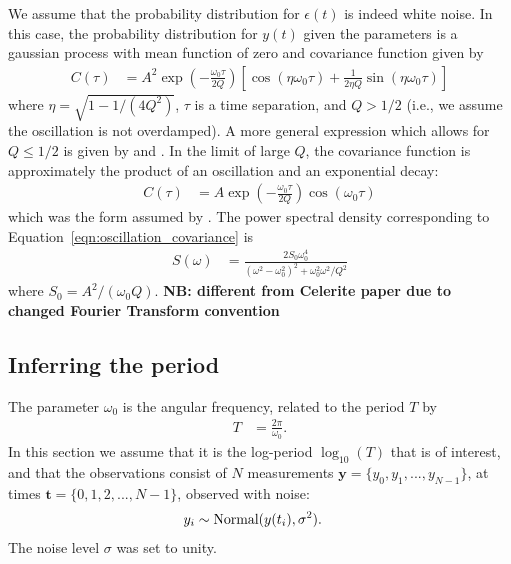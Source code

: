 \documentclass[a4paper, 12pt]{article}
\begin{document}
We assume that the probability distribution for $\epsilon(t)$ is indeed white
noise. In this case, the probability distribution for $y(t)$ given the
parameters is a gaussian process with mean function of zero and
covariance function given by
\begin{align}
C(\tau) &= A^2\exp\left(-\frac{\omega_0\tau}{2Q}\right)
            \left[\cos(\eta\omega_0\tau)
                + \frac{1}{2\eta Q}\sin(\eta\omega_0\tau)\right]
    \label{eqn:oscillation_covariance}
\end{align}
where $\eta = \sqrt{1 - 1/(4Q^2)}$, $\tau$ is a time separation,
and $Q > 1/2$ (i.e., we assume the oscillation is not overdamped).
A more general expression which allows for $Q \leq 1/2$
is given by \citet{anderson} and \citet{celerite}.
In the limit of large $Q$, the covariance function is approximately
the product of an oscillation and an exponential decay:
\begin{align}
C(\tau) &= A\exp\left(-\frac{\omega_0\tau}{2Q}\right)\cos(\omega_0\tau)
\end{align}
which was the form assumed by \citet{brewer_stello}.
The power spectral density corresponding to
Equation~\ref{eqn:oscillation_covariance} is
\begin{align}
S(\omega) &= \frac{2S_0\omega_0^4}
                  {(\omega^2 - \omega_0^2)^2 + \omega_0^2\omega^2/Q^2}
\end{align}
where $S_0 = A^2/(\omega_0Q)$. {\bf NB: different from Celerite paper
due to changed Fourier Transform convention}

\subsection{Inferring the period}
The parameter $\omega_0$ is the angular frequency, related to the period
$T$ by
\begin{align}
T &= \frac{2\pi}{\omega_0}.
\end{align}
In this section we assume that it is the log-period $\log_{10}(T)$ that is
of interest, and that the observations consist of $N$ measurements
$\boldsymbol{y} = \{y_0, y_1, ..., y_{N-1}\}$,
at times $\boldsymbol{t} = \{0,1,2,...,N-1\}$, observed with noise:
\begin{align}
y_i &\sim \textnormal{Normal}(y(t_i), \sigma^2).
\end{align}
The noise level $\sigma$ was set to unity.
\end{document}
